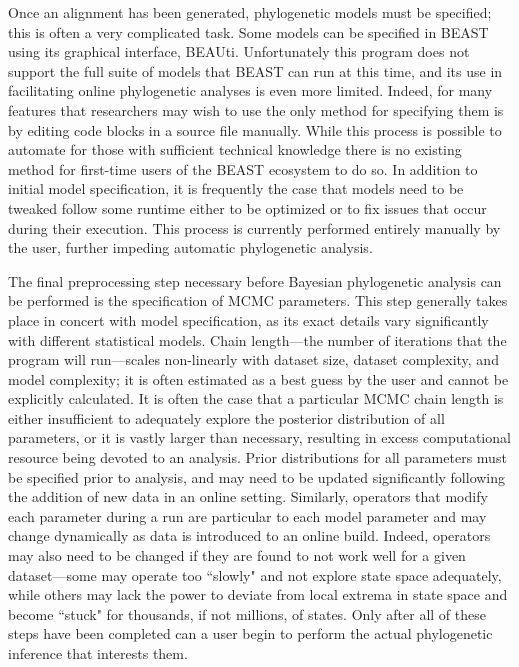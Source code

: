 Once an alignment has been generated, phylogenetic models must be specified; this is often a very complicated task.
Some models can be specified in BEAST using its graphical interface, BEAUti.
Unfortunately this program does not support the full suite of models that BEAST can run at this time, and its use in facilitating online phylogenetic analyses is even more limited.
Indeed, for many features that researchers may wish to use the only method for specifying them is by editing code blocks in a source file manually.
While this process is possible to automate for those with sufficient technical knowledge there is no existing method for first-time users of the BEAST ecosystem to do so.
In addition to initial model specification, it is frequently the case that models need to be tweaked follow some runtime either to be optimized or to fix issues that occur during their execution.
This process is currently performed entirely manually by the user, further impeding automatic phylogenetic analysis.

The final preprocessing step necessary before Bayesian phylogenetic analysis can be performed is the specification of MCMC parameters.
This step generally takes place in concert with model specification, as its exact details vary significantly with different statistical models.
Chain length---the number of iterations that the program will run---scales non-linearly with dataset size, dataset complexity, and model complexity; it is often estimated as a best guess by the user and cannot be explicitly calculated.
It is often the case that a particular MCMC chain length is either insufficient to adequately explore the posterior distribution of all parameters, or it is vastly larger than necessary, resulting in excess computational resource being devoted to an analysis.
Prior distributions for all parameters must be specified prior to analysis, and may need to be updated significantly following the addition of new data in an online setting.
Similarly, operators that modify each parameter during a run are particular to each model parameter and may change dynamically as data is introduced to an online build.
Indeed, operators may also need to be changed if they are found to not work well for a given dataset---some may operate too ``slowly" and not explore state space adequately, while others may lack the power to deviate from local extrema in state space and become ``stuck" for thousands, if not millions, of states.
Only after all of these steps have been completed can a user begin to perform the actual phylogenetic inference that interests them.


